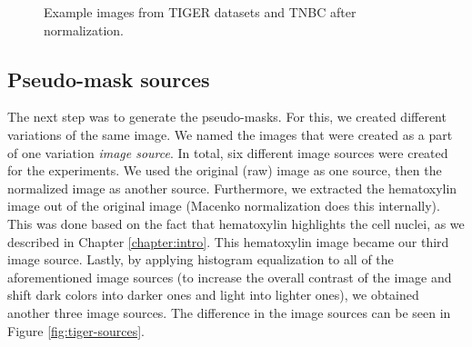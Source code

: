 \begin{figure}[H]
  \caption{Example images from TIGER datasets \cite{tiger_dataset} and TNBC \cite{TNBC-nuclei-seg-extended} after normalization.}
  \label{fig:mix-norm}
\end{figure}


\subsection{Pseudo-mask sources} 
\label{subs:mask-sources}
The next step was to generate the pseudo-masks. For this, we created different variations of the same image. We named the images that were created as a part of one variation \textit{image source}. In total, six different image sources were created for the experiments. We used the original (raw) image as one source, then the normalized image as another source. Furthermore, we extracted the hematoxylin image out of the original image (Macenko normalization does this internally). This was done based on the fact that hematoxylin highlights the cell nuclei, as we described in Chapter \ref{chapter:intro}. This hematoxylin image became our third image source. Lastly, by applying histogram equalization to all of the aforementioned image sources (to increase the overall contrast of the image and shift dark colors into darker ones and light into lighter ones), we obtained another three image sources. The difference in the image sources can be seen in Figure \ref{fig:tiger-sources}. 

